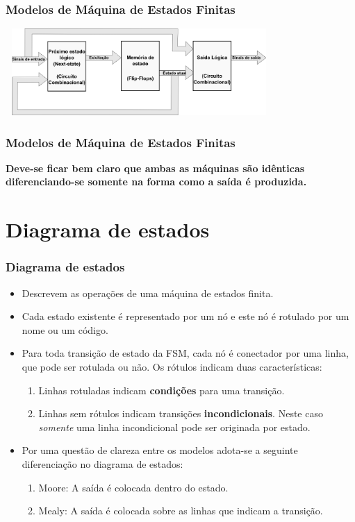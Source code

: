 \documentclass{beamer}
\begin{document}
\begin{frame}
  \frametitle{Modelos de Máquina de Estados Finitas}
    \includegraphics[height = 1.3in, width = 4in]{modelo_8.png}
\end{frame}

\begin{frame}
  \frametitle{Modelos de Máquina de Estados Finitas}
  \textbf{Deve-se ficar bem claro que ambas as máquinas são idênticas diferenciando-se somente na forma como a saída é produzida.}
\end{frame}


\section{Diagrama de estados}
\begin{frame}
  \frametitle{Diagrama de estados}
  \begin{itemize}
    \item Descrevem as operações de uma máquina de estados finita.\pause
    \item Cada estado existente é representado por um nó e este nó é rotulado por um nome ou um código.\pause
    \item Para toda transição de estado da FSM, cada nó é conectador por uma linha, que pode ser rotulada ou não. Os rótulos indicam duas características:\pause
    \begin{enumerate}
     \item Linhas rotuladas indicam \textbf{condições} para uma transição.\pause
     \item Linhas sem rótulos indicam transições \textbf{incondicionais}. Neste caso \textit{somente} uma linha incondicional pode ser originada por estado.\pause
    \end{enumerate}
    \item Por uma questão de clareza entre os modelos adota-se a seguinte diferenciação no diagrama de estados:\pause
    \begin{enumerate}
     \item Moore: A saída é colocada dentro do estado.\pause
     \item Mealy: A saída é colocada sobre as linhas que indicam a transição.
    \end{enumerate}
  \end{itemize}
\end{frame}
\end{document}
